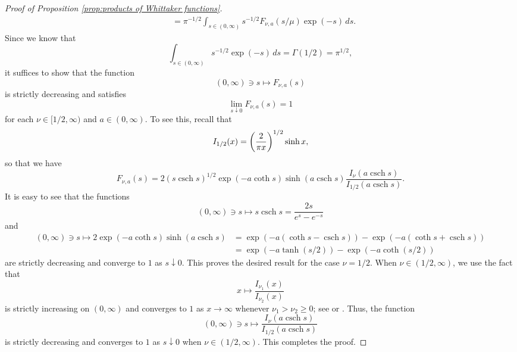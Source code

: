 \documentclass[reqno]{amsart}
\theoremstyle{plain}
\numberwithin{equation}{section}
\theoremstyle{remark}
\newcommand{\intervaloo}[2]{(#1, #2)}
\newcommand{\intervalco}[2]{[#1, #2)}
\newcommand{\BesselI}[1]{I_{#1}}
\DeclareMathOperator{\csch}{csch}
\newcommand{\Fnas}[3]{F_{#1, #2}(#3)}
\begin{document}
\begin{proof}[Proof of Proposition \ref{prop:products of Whittaker functions}]
\begin{align}
	&= \pi^{-1/2} \int_{s \in \intervaloo{0}{\infty}} s^{-1/2} \Fnas{\nu}{a}{s / \mu} \exp(-s)  \, ds .
\end{align}
Since we know that
\begin{equation}
\int_{s \in \intervaloo{0}{\infty}} s^{-1/2} \exp(-s)  \, ds = \Gamma(1/2) = \pi^{1/2},
\end{equation}
it suffices to show that the function
\begin{equation}
\intervaloo{0}{\infty} \ni s \longmapsto \Fnas{\nu}{a}{s}
\end{equation}
is strictly decreasing and satisfies
\begin{equation}
	\lim_{s \downarrow 0} \Fnas{\nu}{a}{s} = 1
\end{equation}
for each $\nu \in \intervalco{1/2}{\infty}$ and $a \in \intervaloo{0}{\infty}$.
To see this, recall that
\begin{equation}
	\BesselI{1/2}(x) = \mleft( \frac{2}{\pi x} \mright)^{1/2} \sinh{x} ,
\end{equation}
so that we have
\begin{equation}
\Fnas{\nu}{a}{s} = 2 (s \csch{s})^{1/2} \exp(- a \coth{s}) \sinh(a \csch{s}) \frac{\BesselI{\nu}(a \csch{s})}{\BesselI{1/2}(a \csch{s})} .
\end{equation}
It is easy to see that the functions
\begin{equation}
\intervaloo{0}{\infty} \ni s \longmapsto s \csch{s} = \frac{2s}{e^{s} - e^{-s}}
\end{equation}
and
\begin{align}
\intervaloo{0}{\infty} \ni s \longmapsto 2 \exp(- a \coth{s}) \sinh(a \csch{s})
	&= \exp( - a (\coth{s} - \csch{s}) ) - \exp( - a (\coth{s} + \csch{s}) ) \\
	&= \exp( - a \tanh{(s/2)}  ) - \exp( - a \coth{(s/2)} )
\end{align}
are strictly decreasing and converge to $1$ as $s \downarrow 0$.
This proves the desired result for the case $\nu = 1/2$. 
When $\nu \in \intervaloo{1/2}{\infty}$, we use the fact that
\begin{equation}
x \longmapsto \frac{\BesselI{\nu_1}(x)}{\BesselI{\nu_2}(x)}
\end{equation}
is strictly increasing on $\intervaloo{0}{\infty}$ and converges to $1$ as $x \to \infty$ whenever $\nu_1 > \nu_2 \geq 0$; see \citet[Theorem 1]{Lor1967} or \citet[Proposition 7.1]{HW1974}.
Thus, the function
\begin{equation}
\intervaloo{0}{\infty} \ni s \longmapsto \frac{\BesselI{\nu}(a \csch{s})}{\BesselI{1/2}(a \csch{s})}
\end{equation}
is strictly decreasing and converges to $1$ as $s \downarrow 0$ when $\nu \in \intervaloo{1/2}{\infty}$.
This completes the proof.
\end{proof}
\end{document}
